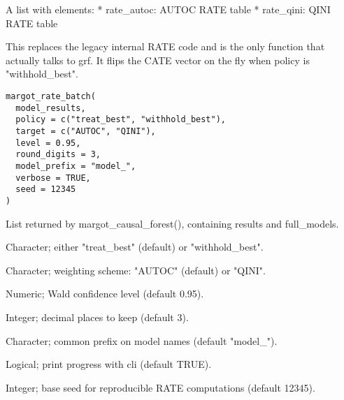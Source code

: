 \documentclass[a4paper]{book}
\begin{document}
%
\begin{Value}
A list with elements:
* rate\_autoc: AUTOC RATE table
* rate\_qini: QINI RATE table
\end{Value}
%
\begin{Description}
This replaces the legacy internal RATE code and is the only function that
actually talks to grf. It flips the CATE vector on the fly when
policy is "withhold\_best".
\end{Description}
%
\begin{Usage}
\begin{verbatim}
margot_rate_batch(
  model_results,
  policy = c("treat_best", "withhold_best"),
  target = c("AUTOC", "QINI"),
  level = 0.95,
  round_digits = 3,
  model_prefix = "model_",
  verbose = TRUE,
  seed = 12345
)
\end{verbatim}
\end{Usage}
%
\begin{Arguments}
\begin{ldescription}
\item[\code{model\_results}] List returned by margot\_causal\_forest(), containing
results and full\_models.

\item[\code{policy}] Character; either "treat\_best" (default) or "withhold\_best".

\item[\code{target}] Character; weighting scheme: "AUTOC" (default) or "QINI".

\item[\code{level}] Numeric; Wald confidence level (default 0.95).

\item[\code{round\_digits}] Integer; decimal places to keep (default 3).

\item[\code{model\_prefix}] Character; common prefix on model names (default "model\_").

\item[\code{verbose}] Logical; print progress with cli (default TRUE).

\item[\code{seed}] Integer; base seed for reproducible RATE computations (default 12345).
\end{ldescription}
\end{Arguments}
\end{document}
